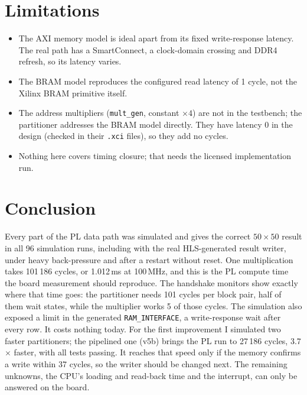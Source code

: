 \documentclass[11pt,a4paper]{article}
\newcommand{\code}[1]{\texttt{#1}}
\begin{document}
\section{Limitations}
\begin{itemize}[noitemsep]
  \item The AXI memory model is ideal apart from its fixed write-response latency. The real path has a SmartConnect, a clock-domain crossing and DDR4 refresh, so its latency varies.
  \item The BRAM model reproduces the configured read latency of 1 cycle, not the Xilinx BRAM primitive itself.
  \item The address multipliers (\code{mult\_gen}, constant $\times4$) are not in the testbench; the partitioner addresses the BRAM model directly. They have latency 0 in the design (checked in their \code{.xci} files), so they add no cycles.
  \item Nothing here covers timing closure; that needs the licensed implementation run.
\end{itemize}

\section{Conclusion}
Every part of the PL data path was simulated and gives the correct $50\times50$ result in all 96 simulation runs, including with the real HLS-generated result writer, under heavy back-pressure and after a restart without reset. One multiplication takes 101\,186 cycles, or 1.012\,ms at 100\,MHz, and this is the PL compute time the board measurement should reproduce. The handshake monitors show exactly where that time goes: the partitioner needs 101 cycles per block pair, half of them wait states, while the multiplier works 5 of those cycles. The simulation also exposed a limit in the generated \code{RAM\_INTERFACE}, a write-response wait after every row. It costs nothing today. For the first improvement I simulated two faster partitioners; the pipelined one (v5b) brings the PL run to 27\,186 cycles, 3.7$\times$ faster, with all tests passing. It reaches that speed only if the memory confirms a write within 37 cycles, so the writer should be changed next. The remaining unknowns, the CPU's loading and read-back time and the interrupt, can only be answered on the board.
\end{document}
